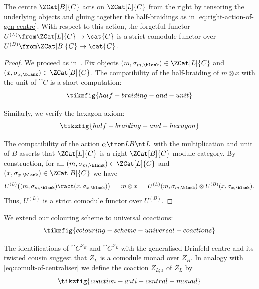 \begin{lemma}\label{lem: right_action_through_centralisers}
  The centre \(\ZCat[B]{C}\) acts on \(\ZCat[L]{C}\) from the right
  by tensoring the underlying objects
  and gluing together the half-braidings
  as in \cref{eq:right-action-of-gen-centre}.
  With respect to this action,
  the forgetful functor \(U^{(L)} \from \ZCat[L]{C} \to \cat{C} \)
  is a strict comodule functor over \(U^{(B)} \from  \ZCat[B]{C} \to \cat{C}\).
\end{lemma}
\begin{proof}
  We proceed as in~\cite[Proposition~5.9]{Bruguieres2012}.
  Fix objects \((m, \sigma_{m, \blank} ) \in \ZCat[L]{C}\) and \((x, \sigma_{x,\blank}) \in \ZCat[B]{C}\).
  The compatibility of the half-braiding of \(m \otimes x\)
  with the unit of \(\cat{C}\) is a short computation:
  \[
    \tikzfig{half-braiding-and-unit}
  \]

  Similarly, we verify the hexagon axiom:
  \[
    \tikzfig{half-braiding-and-hexagon}
  \]

  The compatibility of the action \(\alpha \from LB \nt L\) with the multiplication and unit of \(B\)
  asserts that \(\ZCat[L]{C}\) is a right \(\ZCat[B]{C}\)\hyp{}module category.
  By construction,
  for all \((m, \sigma_{m, \blank} ) \in \ZCat[L]{C}\) and \((x, \sigma_{x,\blank}) \in \ZCat[B]{C}\)
  we have
  \[
    U^{(L)}\big( (m, \sigma_{m,\blank}) \ract (x, \sigma_{x,\blank}) \big)
    \,=\, m \otimes x \,=\,
    U^{(L)}(m, \sigma_{m,\blank}) \otimes U^{(B)} (x, \sigma_{x,\blank}).
  \]
  Thus, \(U^{(L)}\) is a strict comodule functor over \(U^{(B)}\).
\end{proof}

\begin{notation}
  We extend our colouring scheme to universal coactions:
  \[
    \tikzfig{colouring-scheme-universal-coactions}
  \]
\end{notation}

\begin{remark}
  The identifications of \(\cat{C}^{Z_B}\) and \(\cat{C}^{Z_L}\) with the generalised Drinfeld centre
  and its twisted cousin suggest that \(Z_L\) is a comodule monad over \(Z_B\).
  In analogy with \cref{eq:comult-of-centraliser}
  we define the coaction \(Z_{L;\mathsf{a}}\) of \(Z_L\) by
  \begin{equation}\label{eq:coaction-anti-central-monad}
    \tikzfig{coaction-anti-central-monad}
  \end{equation}
\end{remark}

